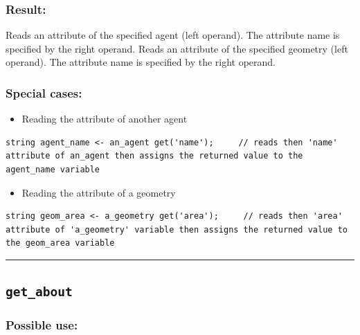 \documentclass[]{book}
\providecommand{\tightlist}{%
  \setlength{\itemsep}{0pt}\setlength{\parskip}{0pt}}
\theoremstyle{definition}
\theoremstyle{definition}
\theoremstyle{definition}
\theoremstyle{remark}
\begin{document}
\subsubsection{Result:}\label{result-187}

Reads an attribute of the specified agent (left operand). The attribute
name is specified by the right operand. Reads an attribute of the
specified geometry (left operand). The attribute name is specified by
the right operand.

\subsubsection{Special cases:}\label{special-cases-71}

\begin{itemize}
\tightlist
\item
  Reading the attribute of another agent
\end{itemize}

\begin{verbatim}
string agent_name <- an_agent get('name');     // reads then 'name' attribute of an_agent then assigns the returned value to the agent_name variable 
\end{verbatim}

\begin{itemize}
\tightlist
\item
  Reading the attribute of a geometry
\end{itemize}

\begin{verbatim}
string geom_area <- a_geometry get('area');     // reads then 'area' attribute of 'a_geometry' variable then assigns the returned value to the geom_area variable 
\end{verbatim}

\begin{center}\rule{0.5\linewidth}{\linethickness}\end{center}

\subsection{\texorpdfstring{\texttt{get\_about}}{get\_about}}\label{get_about}

\subsubsection{Possible use:}\label{possible-use-194}
\end{document}
